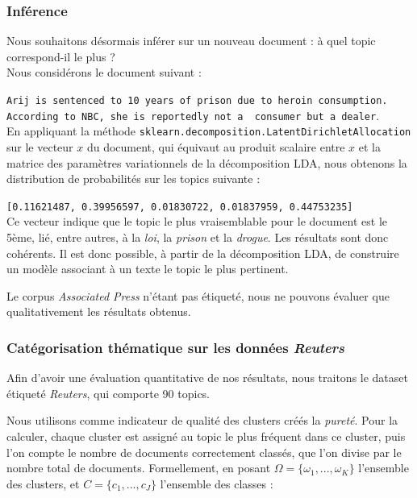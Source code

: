 \documentclass[a4paper]{article}
\begin{document}
\subsubsection{Inférence}

Nous souhaitons désormais inférer sur un nouveau document : à quel topic
correspond-il le plus ? \\

Nous considérons le document suivant : 

\texttt{Arij is sentenced to 10 years of prison due to heroin consumption.
According to NBC, she is reportedly not a \ consumer but a dealer}. \\

En appliquant la méthode
\texttt{sklearn.decomposition.LatentDirichletAllocation} sur le vecteur $x$ du
document, qui équivaut au produit scalaire entre $x$ et la matrice des
paramètres variationnels de la décomposition LDA, nous obtenons la distribution
de probabilités sur les topics suivante :

\texttt{[0.11621487, 0.39956597, 0.01830722, 0.01837959, 0.44753235]} \\

Ce vecteur indique que le topic le plus vraisemblable pour le document est le
5ème, lié, entre autres, à la \emph{loi}, la \emph{prison} et la \emph{drogue}.
Les résultats sont donc cohérents. Il est donc possible, à partir de la
décomposition LDA, de construire un modèle associant à un texte le topic le plus
pertinent.

Le corpus \emph{Associated Press} n'étant pas étiqueté, nous ne pouvons évaluer
que qualitativement les résultats obtenus.

\subsubsection{Catégorisation thématique sur les données \emph{Reuters}}

Afin d'avoir une évaluation quantitative de nos résultats, nous traitons le
dataset étiqueté \emph{Reuters}, qui comporte 90 topics. 

Nous utilisons comme indicateur de qualité des clusters créés la \emph{pureté}.
Pour la calculer, chaque cluster est assigné au topic le plus fréquent dans ce
cluster, puis l'on compte le nombre de documents correctement classés, que l'on
divise par le nombre total de documents. Formellement, en posant $\Omega =
\{\omega_1,...,\omega_K\}$ l'ensemble des clusters, et $C = \{c_1,...,c_J\}$
l'ensemble des classes :
\end{document}
